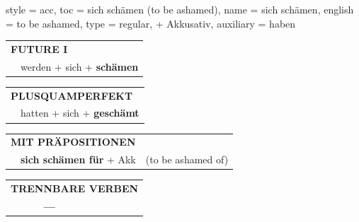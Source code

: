 \begin{verbentry}{
  style = {acc},
  toc = {sich schämen (to be ashamed)},
  name = {sich schämen},
  english = {to be ashamed},
  type = {regular, + Akkusativ},
  auxiliary = {haben}
}
\begin{tabular}{rl}
    \multicolumn{2}{l}{\textbf{FUTURE I} }\\
    &werden + sich + \textbf{schämen}\\
 
  \end{tabular}
\hfill
   \begin{tabular}{rl}
      \multicolumn{2}{l}{\textbf{PLUSQUAMPERFEKT}}\\
    &hatten + sich + \textbf{geschämt}\\
  \end{tabular}
  
\vspace{10pt}

   \begin{tabular}{lll}
      \multicolumn{3}{l}{\textbf{MIT PRÄPOSITIONEN}}\\
& \textbf{sich schämen für} + Akk & (to be ashamed of)
  \end{tabular}
\hfill
\begin{tabular}{lll}
\multicolumn{3}{l}{\textbf{TRENNBARE VERBEN}}\\
& \textbf{---} & \\
\end{tabular}
  
  \vspace{-5pt}
\end{verbentry}

